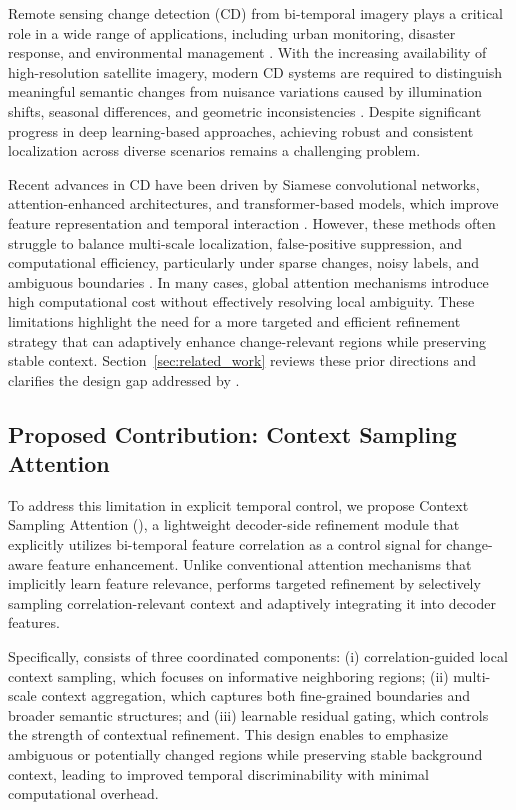 Remote sensing change detection (CD) from bi-temporal imagery plays a critical role in a wide range of applications, including urban monitoring, disaster response, and environmental management \cite{aisha2023,jungeun2025,seda2022,kyaw2024,r2024,j2026}. With the increasing availability of high-resolution satellite imagery, modern CD systems are required to distinguish meaningful semantic changes from nuisance variations caused by illumination shifts, seasonal differences, and geometric inconsistencies \cite{devansh2025,zainoolabadien2020,k2024,sai2026}. Despite significant progress in deep learning-based approaches, achieving robust and consistent localization across diverse scenarios remains a challenging problem.

Recent advances in CD have been driven by Siamese convolutional networks, attention-enhanced architectures, and transformer-based models, which improve feature representation and temporal interaction \cite{daudt2018fully,chen2020stanet,chen2022bit,bandara2022changeformer}. However, these methods often struggle to balance multi-scale localization, false-positive suppression, and computational efficiency, particularly under sparse changes, noisy labels, and ambiguous boundaries \cite{yan2024,shanshan2024,wei2024,devansh2025}. In many cases, global attention mechanisms introduce high computational cost without effectively resolving local ambiguity. These limitations highlight the need for a more targeted and efficient refinement strategy that can adaptively enhance change-relevant regions while preserving stable context. Section~\ref{sec:related_work} reviews these prior directions and clarifies the design gap addressed by \cosa{}.


\subsection{Proposed Contribution: Context Sampling Attention}
To address this limitation in explicit temporal control, we propose Context Sampling Attention (\cosa{}), a lightweight decoder-side refinement module that explicitly utilizes bi-temporal feature correlation as a control signal for change-aware feature enhancement. Unlike conventional attention mechanisms that implicitly learn feature relevance, \cosa{} performs targeted refinement by selectively sampling correlation-relevant context and adaptively integrating it into decoder features.

Specifically, \cosa{} consists of three coordinated components: (i) correlation-guided local context sampling, which focuses on informative neighboring regions; (ii) multi-scale context aggregation, which captures both fine-grained boundaries and broader semantic structures; and (iii) learnable residual gating, which controls the strength of contextual refinement. This design enables \cosa{} to emphasize ambiguous or potentially changed regions while preserving stable background context, leading to improved temporal discriminability with minimal computational overhead.

